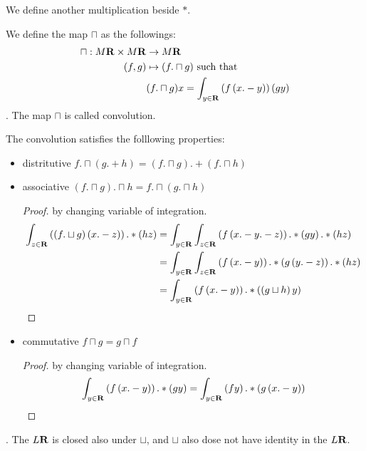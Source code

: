 We define another multiplication beside $*$.
\begin{definition}[Convolution]
We define the map $\sqcap$ as the followings:
\begin{equation}\begin{split}
	\sqcap: M{\mathbf{R}}\times M{\mathbf{R}} &\to M{\mathbf{R}} \\
	(f,g) &\mapsto (f.\sqcap g) \text{ such that} \\
	& (f.\sqcap g)x = \int_{y\in{\mathbf{R}}}\left({f\left({x.-y}\right)}\right)\left({gy}\right) \\
\end{split}\end{equation}
. The map $\sqcap$ is called convolution.
\end{definition}
The convolution satisfies the folllowing properties:
\begin{itemize}
\item distritutive $f.\sqcap(g.+ h) = (f.\sqcap g).+ (f.\sqcap h)$
\item associative $(f.\sqcap g).\sqcap h = f.\sqcap(g.\sqcap h)$
	\begin{proof}
		by changing variable of integration.
		\begin{equation*}\begin{split}
			\int_{{z}\in{\mathbf{R}}}\left({\left({f.\sqcup g}\right)\left({x.-z}\right)}\right).*\left({hz}\right)
				&= \int_{{y}\in{\mathbf{R}}}\int_{{z}\in{\mathbf{R}}}\left({f\left({x.-y.-z}\right)}\right).*\left({gy}\right).*\left({hz}\right) \\
				&= \int_{{y}\in{\mathbf{R}}}\int_{{z}\in{\mathbf{R}}}\left({f\left({x.-y}\right)}\right).*\left({g\left({y.-z}\right)}\right).*\left({hz}\right) \\
				&= \int_{{y}\in{\mathbf{R}}}\left({f\left({x.-y}\right)}\right).*\left({\left({g\sqcup h}\right)y}\right) \\
		\end{split}\end{equation*}
	\end{proof}
\item commutative $f\sqcap g = g\sqcap f$
	\begin{proof}
		by changing variable of integration.
		\begin{equation*}\begin{split}
			\int_{{y}\in{\mathbf{R}}}\left({f\left({x.-y}\right)}\right).*\left({gy}\right)
			&= \int_{{y}\in{\mathbf{R}}}\left({fy}\right).*\left({g\left({x.-y}\right)}\right) \\
		\end{split}\end{equation*}
	\end{proof}
\end{itemize}
.
The $L{\mathbf{R}}$ is closed also under $\sqcup$, and $\sqcup$ also dose not
have identity in the $L{\mathbf{R}}$.

